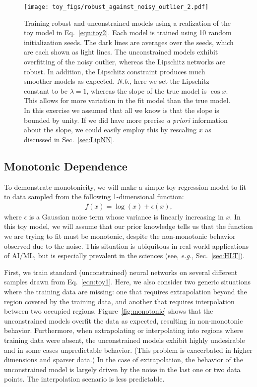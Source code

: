\documentclass{article}
\begin{document}
\begin{figure}[t!]
    \centering
\texttt{[image: toy\_figs/robust\_against\_noisy\_outlier\_2.pdf]}
    \caption{Training robust and unconstrained models using a realization of the toy model in Eq.~\eqref{eqn:toy2}.  
    Each model is trained using 10 random initialization seeds. 
    The dark lines are averages over the seeds, which are each shown as light lines. 
    The unconstrained models exhibit overfitting of the noisy outlier,  whereas the Lipschitz networks are robust. 
    In addition, the Lipschitz constraint produces much smoother models as expected. {\em N.b.}, here we set the Lipschitz constant to be $\lambda = 1$, whereas the slope of the true model is $\cos{x}$. This allows for more variation in the fit model than the true model. In this exercise we assumed that all we know is that the slope is bounded by unity. If we did have more precise {\em a priori} information about the slope, we could easily employ this by rescaling $x$ as discussed in Sec.~\ref{sec:LipNN}. 
    }
    \label{fig:robust}
\end{figure}


\subsection{Monotonic Dependence}

To demonstrate monotonicity, we will make a simple toy regression model to fit to data sampled from the following 1-dimensional function: 
\begin{align}
f(x) = \log(x) + \epsilon(x),
\label{eqn:toy1}
\end{align}
where $\epsilon$ is a Gaussian noise term whose variance is linearly increasing in $x$. 
In this toy model, we will assume that our prior knowledge tells us that the function we are trying to fit must be monotonic, despite the non-monotonic behavior observed due to the noise. 
This situation is ubiquitous in real-world applications of AI/ML, but is especially prevalent in the sciences (see, {\em e.g.}, Sec.~\ref{sec:HLT}).  

First, we train standard (unconstrained) neural networks on several different samples drawn from Eq.~\eqref{eqn:toy1}. 
Here, we also consider two generic situations where the training data are missing: one that requires extrapolation beyond the region covered by the training data, and another that requires interpolation between two occupied regions. 
Figure~\ref{fig:monotonic} shows that the unconstrained models overfit the data as expected, resulting in non-monotonic behavior. Furthermore, when extrapolating or interpolating into regions where training data were absent, the unconstrained models exhibit highly undesirable and in some cases unpredictable behavior. 
(This problem is exacerbated in higher dimensions and sparser data.) 
In the case of extrapolation, the behavior of the unconstrained model is largely driven by the noise in the last one or two data points.
The interpolation scenario is less predictable. 
\end{document}
